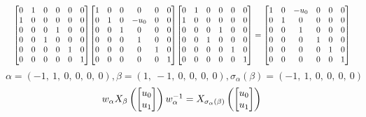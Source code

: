 \documentclass[11pt]{article}
\theoremstyle{definition}
\begin{document}
\[
\scaletoalign{\textwidth}{{\left[\begin{matrix}0 & 1 & 0 & 0 & 0 & 0\\1 & 0 & 0 & 0 & 0 & 0\\0 & 0 & 0 & 1 & 0 & 0\\0 & 0 & 1 & 0 & 0 & 0\\0 & 0 & 0 & 0 & 1 & 0\\0 & 0 & 0 & 0 & 0 & 1\end{matrix}\right]} {\left[\begin{matrix}1 & 0 & 0 & 0 & 0 & 0\\0 & 1 & 0 & - u_{0} & 0 & 0\\0 & 0 & 1 & 0 & 0 & 0\\0 & 0 & 0 & 1 & 0 & 0\\0 & 0 & 0 & 0 & 1 & 0\\0 & 0 & 0 & 0 & 0 & 1\end{matrix}\right]} {\left[\begin{matrix}0 & 1 & 0 & 0 & 0 & 0\\1 & 0 & 0 & 0 & 0 & 0\\0 & 0 & 0 & 1 & 0 & 0\\0 & 0 & 1 & 0 & 0 & 0\\0 & 0 & 0 & 0 & 1 & 0\\0 & 0 & 0 & 0 & 0 & 1\end{matrix}\right]} = {\left[\begin{matrix}1 & 0 & - u_{0} & 0 & 0 & 0\\0 & 1 & 0 & 0 & 0 & 0\\0 & 0 & 1 & 0 & 0 & 0\\0 & 0 & 0 & 1 & 0 & 0\\0 & 0 & 0 & 0 & 1 & 0\\0 & 0 & 0 & 0 & 0 & 1\end{matrix}\right]}}
\]
\[
\alpha = \left( -1, \  1, \  0, \  0, \  0, \  0\right), \beta = \left( 1, \  -1, \  0, \  0, \  0, \  0\right), \sigma_{\alpha}(\beta) = \left( -1, \  1, \  0, \  0, \  0, \  0\right)
\]
\[
\scaletoalign{\textwidth}{w_{\alpha} X_{\beta}\left(\left[\begin{matrix}u_{0}\\u_{1}\end{matrix}\right]\right) w_{\alpha}^{-1} = X_{\sigma_{\alpha}\left(\beta\right)}\left(\left[\begin{matrix}u_{0}\\u_{1}\end{matrix}\right]\right)}
\]
\end{document}
